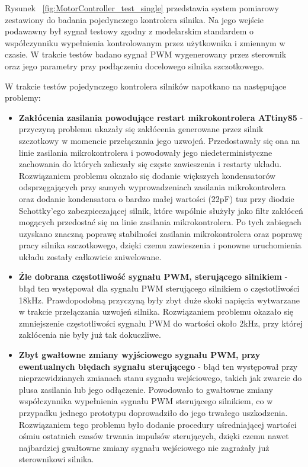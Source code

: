 Rysunek ~\ref{fig:MotorController_test_single} przedstawia system pomiarowy zestawiony do badania pojedynczego kontrolera silnika. Na jego wejście podawawny był sygnał testowy zgodny z modelarskim standardem o współczynniku wypełnienia kontrolowanym przez użytkownika i zmiennym w czasie. W trakcie testów badano sygnał PWM wygenerowany przez sterownik oraz jego parametry przy podłączeniu docelowego silnika szczotkowego.

W trakcie testów pojedynczego kontrolera silników napotkano na następujące problemy:
\begin{itemize}
	\item \textbf{Zakłócenia zasilania powodujące restart mikrokontrolera ATtiny85} - przyczyną problemu ukazały się zakłócenia generowane przez silnik szczotkowy w momencie przełączania jego uzwojeń. Przedostawały się ona na linie zasilania mikrokontrolera i powodowały jego niedeterministyczne zachowania do których zaliczały się częste zawieszenia i restarty układu. Rozwiązaniem problemu okazało się dodanie większych kondensatorów odsprzęgających przy samych wyprowadzeniach zasilania mikrokontrolera oraz dodanie kondensatora o bardzo małej wartości (22pF) tuz przy diodzie Schottky'ego zabezpieczającej silnik, które wspólnie służyły jako  filtr zakłóceń mogących przedostać się na linie zasilania mikrokontrolera. Po tych zabiegach uzyskano znaczną poprawę stabilności zasilania mikrokontrolera oraz poprawę pracy silnika szczotkowego, dzięki czemu zawieszenia i ponowne uruchomienia układu zostały całkowicie zniwelowane.
	\item \textbf{Źle dobrana częstotliwość sygnału PWM, sterującego silnikiem} - błąd ten występował dla sygnału PWM sterującego silnikiem o częstotliwości 18kHz. Prawdopodobną przyczyną były zbyt duże skoki napięcia wytwarzane w trakcie przełączania uzwojeń silnika. Rozwiązaniem problemu okazało się zmniejszenie częstotliwości sygnału PWM do wartości około 2kHz, przy której zakłócenia nie były już tak dokuczliwe.
	\item \textbf{Zbyt gwałtowne zmiany wyjściowego sygnału PWM, przy ewentualnych błędach sygnału sterującego} - błąd ten występował przy nieprzewidzianych zmianach stanu sygnału wejściowego, takich jak zwarcie do plusa zasilania lub jego odłączenie. Powodowało to gwałtowne zmiany współczynnika wypełnienia sygnału PWM sterującego silnikiem, co w przypadku jednego prototypu doprowadziło do jego trwałego uszkodzenia. Rozwiązaniem tego problemu było dodanie procedury uśredniającej wartości ośmiu ostatnich czasów trwania impulsów sterujących, dzięki czemu nawet najbardziej gwałtowne zmiany sygnału wejściowego nie zagrażały już sterownikowi silnika.
\end{itemize}

